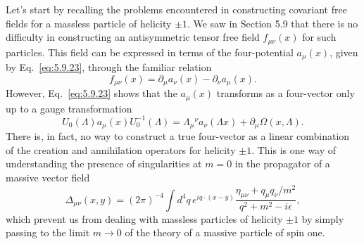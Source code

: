 Let's start by recalling the problems encountered in constructing covariant
free fields for a massless particle of helicity $\pm1$. We saw in Section 5.9
that there is no difficulty in constructing an antisymmetric tensor free
field $f_{\mu\nu}(x)$ for such particles. This field can be expressed in terms of the
four-potential $a_\mu(x)$, given by Eq.~\eqref{eq:5.9.23}, through the familiar relation
\begin{equation}
  f_{\mu\nu}(x)=\partial_\mu a_\nu(x)-\partial_\nu a_\mu(x).
  \tag{8.1.1}\label{eq:8.1.1}
\end{equation}
However, Eq.~\eqref{eq:5.9.23} shows that the $a_\mu(x)$ transforms as a four-vector
only up to a gauge transformation
\begin{equation}
  U_0(\Lambda)a_\mu(x)U_0^{-1}(\Lambda)
  =\Lambda_\mu{}^\nu a_\nu(\Lambda x)+\partial_\mu\Omega(x,\Lambda).
  \tag{8.1.2}\label{eq:8.1.2}
\end{equation}
There is, in fact, no way to construct a true four-vector as a linear
combination of the creation and annihilation operators for helicity $\pm1$.
This is one way of understanding the presence of singularities at $m=0$ in
the propagator of a massive vector field
\[
  \Delta_{\mu\nu}(x,y)=(2\pi)^{-4}\int d^4q\,e^{iq\cdot(x-y)}
  \frac{\eta_{\mu\nu}+q_\mu q_\nu/m^2}{q^2+m^2-i\epsilon},
\]
which prevent us from dealing with massless particles of helicity $\pm1$ by
simply passing to the limit $m\to0$ of the theory of a massive particle of
spin one.


